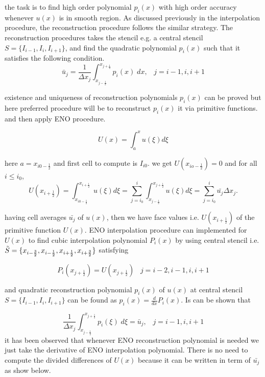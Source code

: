 \documentclass{article}
\begin{document}
\noindent the task is to find high order polynomial $p_i(x)$ with high order accuracy whenever $u(x)$ is in smooth region. As discussed previously in the interpolation procedure, the reconstruction procedure follows the similar strategy. The reconstruction procedures takes the stencil e.g. a central stencil $S = \{ I_{i-1},I_i, I_{i+1}\}$, and find the quadratic polynomial $p_i(x)$ such that it satisfies the following condition.
\begin{equation}
     \bar{u}_{j} = \frac{1}{\Delta x_j} \int_{x_{j - \frac{1}{2}}}^{x_{j + \frac{1}{2}}} p_i(x)\;dx , \;\;\; j=i-1,i,i+1
\end{equation}

\noindent existence and uniqueness of reconstruction polynomials $p_i(x)$ can be proved but here preferred procedure will be to reconstruct $p_i(x)$ it via primitive functions. and then apply ENO procedure.

\begin{equation}
    U(x) = \int _a^x u(\xi) d\xi 
\end{equation}

\noindent here $a= x_{i0 - \frac{1}{2}} $ and first cell to compute is $I_{i0}$. we get $U(x_{io - \frac{1}{2}}) = 0$ and for all $i \leq i_0$,
\begin{equation}
    U(x_{i+\frac{1}{2}}) = \int_{x_{i0 - \frac{1}{2}}}^ {x_{i + \frac{1}{2}}} u(\xi) d\xi = \sum_{j=i_0}^{i} \int_{x_{j - \frac{1}{2}}}^ {x_{j + \frac{1}{2}}} u(\xi) d\xi = \sum_{j=i_0}^{i} \bar{u_j} \Delta x_j.
\end{equation}

\noindent having cell averages $\bar{u_j}$ of $u(x)$, then we have face values i.e. $U(x_{i + \frac{1}{2}})$ of the primitive function $U(x)$. ENO interpolation procedure can implemented for $U(x)$ to find cubic interpolation polynomial $P_i(x)$ by using central stencil i.e. $\Tilde{S} = \{ x_{i-\frac{3}{2}},x_{i-\frac{1}{2}} , x_{i+\frac{1}{2}} , x_{i+\frac{3}{2}} \}$ satisfying

\begin{equation}
    P_i(x_{j+\frac{1}{2}}) = U(x_{j+\frac{1}{2}}) \;\;\; j = i-2,i-1,i,i+1
\end{equation}

\noindent and quadratic reconstruction polynomial $p_i(x)$ of $u(x)$ at central stencil  $S = \{ I_{i-1},I_i, I_{i+1}\}$ can be found as  $p_i(x) = \frac{d}{dx} P_i(x)$. Is can be shown that 

\begin{equation}
     \frac{1}{\Delta x_j} \int_{x_{j - \frac{1}{2}}}^{x_{j + \frac{1}{2}}} p_i(\xi)\;d\xi = \bar{u}_{j} , \;\;\; j=i-1,i,i+1
\end{equation}
\noindent it has been observed that whenever ENO reconstruction polynomial is needed we just take the derivative of ENO interpolation polynomial. There is no need to compute the divided differences of $U(x)$ because it can be written in term of $\bar{u_j}$ as show below.
\end{document}
